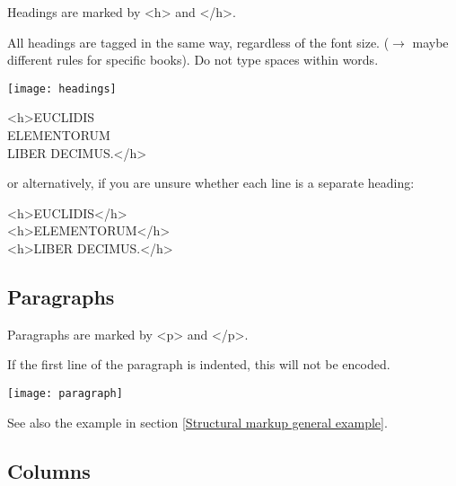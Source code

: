 \begin{mainrule}
Headings are marked by <h> and </h>.
\end{mainrule}

\begin{clarification}
All headings are tagged in the same way, regardless of the font size. ($\to$ maybe different rules for specific books). Do not type spaces within words.
\end{clarification}

\begin{example}

\texttt{[image: headings]} 

\begin{typeLatin}
<h>EUCLIDIS \\
ELEMENTORUM \\
LIBER DECIMUS.</h>
\end{typeLatin}

or alternatively, if you are unsure whether each line is a separate heading:

\begin{typeLatin}
<h>EUCLIDIS</h> \\
<h>ELEMENTORUM</h> \\
<h>LIBER DECIMUS.</h>
\end{typeLatin}

\end{example}


\subsection{Paragraphs} 

\begin{mainrule}
Paragraphs are marked by <p> and </p>.
\end{mainrule}

\begin{clarification}
If the first line of the paragraph is indented, this will not be encoded.
\end{clarification}

\begin{example}

\texttt{[image: paragraph]} 


See also the example in section \ref{Structural markup general example}.
\end{example}

\subsection{Columns}

